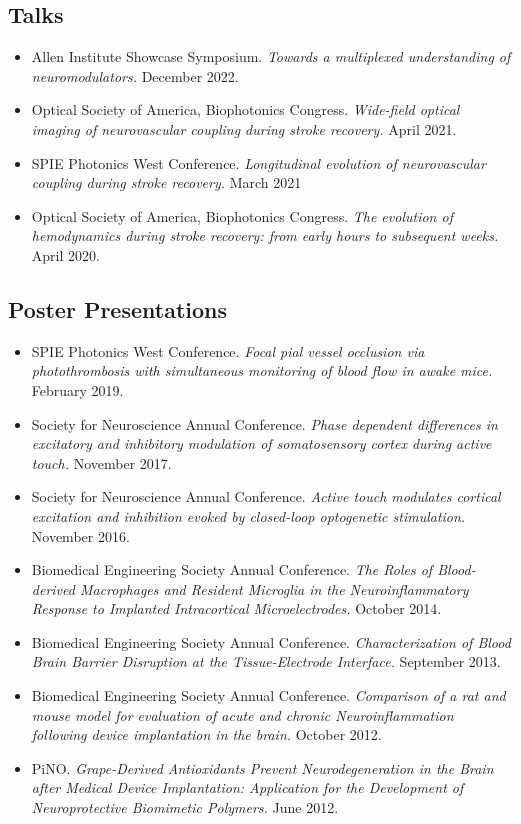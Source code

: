 \documentclass[
  letterpaper,
  DIV=11,
  numbers=noendperiod]{scrartcl}
\providecommand{\tightlist}{%
  \setlength{\itemsep}{0pt}\setlength{\parskip}{0pt}}\usepackage{longtable,booktabs,array}
\begin{document}
\hypertarget{talks}{%
\subsection{Talks}\label{talks}}

\begin{itemize}
\tightlist
\item
  Allen Institute Showcase Symposium. \emph{Towards a multiplexed
  understanding of neuromodulators.} December 2022.
\item
  Optical Society of America, Biophotonics Congress. \emph{Wide-field
  optical imaging of neurovascular coupling during stroke recovery.}
  April 2021.
\item
  SPIE Photonics West Conference. \emph{Longitudinal evolution of
  neurovascular coupling during stroke recovery.} March 2021
\item
  Optical Society of America, Biophotonics Congress. \emph{The evolution
  of hemodynamics during stroke recovery: from early hours to subsequent
  weeks.} April 2020.
\end{itemize}

\hypertarget{poster-presentations}{%
\subsection{Poster Presentations}\label{poster-presentations}}

\begin{itemize}
\tightlist
\item
  SPIE Photonics West Conference. \emph{Focal pial vessel occlusion via
  photothrombosis with simultaneous monitoring of blood flow in awake
  mice.} February 2019.
\item
  Society for Neuroscience Annual Conference. \emph{Phase dependent
  differences in excitatory and inhibitory modulation of somatosensory
  cortex during active touch.} November 2017.
\item
  Society for Neuroscience Annual Conference. \emph{Active touch
  modulates cortical excitation and inhibition evoked by closed-loop
  optogenetic stimulation.} November 2016.
\item
  Biomedical Engineering Society Annual Conference. \emph{The Roles of
  Blood-derived Macrophages and Resident Microglia in the
  Neuroinflammatory Response to Implanted Intracortical
  Microelectrodes.} October 2014.
\item
  Biomedical Engineering Society Annual Conference.
  \emph{Characterization of Blood Brain Barrier Disruption at the
  Tissue-Electrode Interface.} September 2013.
\item
  Biomedical Engineering Society Annual Conference. \emph{Comparison of
  a rat and mouse model for evaluation of acute and chronic
  Neuroinflammation following device implantation in the brain.} October
  2012.
\item
  PiNO. \emph{Grape-Derived Antioxidants Prevent Neurodegeneration in
  the Brain after Medical Device Implantation: Application for the
  Development of Neuroprotective Biomimetic Polymers.} June 2012.
\end{itemize}
\end{document}
